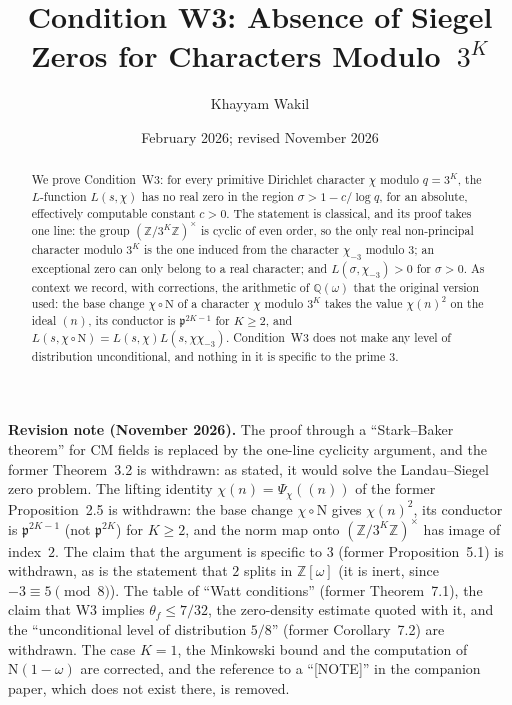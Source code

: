 \documentclass[12pt]{amsart}
\title[Condition W3]{Condition W3: Absence of Siegel Zeros for Characters
  Modulo~$3^K$}
\author{Khayyam Wakil}
\date{February 2026; revised November 2026}
\theoremstyle{plain}
\theoremstyle{definition}
\theoremstyle{remark}
\newcommand{\Z}{\mathbb{Z}}
\newcommand{\Q}{\mathbb{Q}}
\newcommand{\Zomega}{\Z[\omega]}
\newcommand{\Nf}{\mathrm{N}}          %
\newcommand{\pp}{\mathfrak{p}}        %
\begin{document}
\begin{abstract}
We prove Condition~W3: for every primitive Dirichlet character $\chi$ modulo
$q = 3^K$, the $L$-function $L(s, \chi)$ has no real zero in the region
$\sigma > 1 - c/\!\log q$, for an absolute, effectively computable constant
$c > 0$. The statement is classical, and its proof takes one line: the group
$(\Z/3^K\Z)^\times$ is cyclic of even order, so the only real non-principal
character modulo $3^K$ is the one induced from the character $\chi_{-3}$
modulo $3$; an exceptional zero can only belong to a real character; and
$L(\sigma,\chi_{-3}) > 0$ for $\sigma > 0$. As context we record, with
corrections, the arithmetic of $\Q(\omega)$ that the original version used:
the base change $\chi\circ\mathrm{N}$ of a character $\chi$ modulo $3^K$
takes the value $\chi(n)^2$ on the ideal $(n)$, its conductor is
$\mathfrak p^{2K-1}$ for $K \geq 2$, and
$L(s,\chi\circ\mathrm{N}) = L(s,\chi)L(s,\chi\chi_{-3})$. Condition~W3
does not make any level of distribution unconditional, and nothing in it is
specific to the prime $3$.
\end{abstract}

\maketitle

\noindent\textbf{Revision note (November 2026).}
The proof through a ``Stark--Baker theorem'' for CM fields is replaced by the
one-line cyclicity argument, and the former Theorem~3.2 is withdrawn: as
stated, it would solve the Landau--Siegel zero problem. The lifting identity
$\chi(n) = \Psi_\chi((n))$ of the former Proposition~2.5 is withdrawn: the
base change $\chi\circ\Nf$ gives $\chi(n)^2$, its conductor is $\pp^{2K-1}$
(not $\pp^{2K}$) for $K \geq 2$, and the norm map onto $(\Z/3^K\Z)^\times$
has image of index~$2$. The claim that the argument is specific to $3$
(former Proposition~5.1) is withdrawn, as is the statement that $2$ splits
in $\Zomega$ (it is inert, since $-3 \equiv 5 \pmod 8$). The table of
``Watt conditions'' (former Theorem~7.1), the claim that W3 implies
$\theta_f \leq 7/32$, the zero-density estimate quoted with it, and the
``unconditional level of distribution $5/8$'' (former Corollary~7.2) are
withdrawn. The case $K = 1$, the Minkowski bound and the computation of
$\Nf(1-\omega)$ are corrected, and the reference to a ``[NOTE]'' in the
companion paper, which does not exist there, is removed.

\tableofcontents
\end{document}
